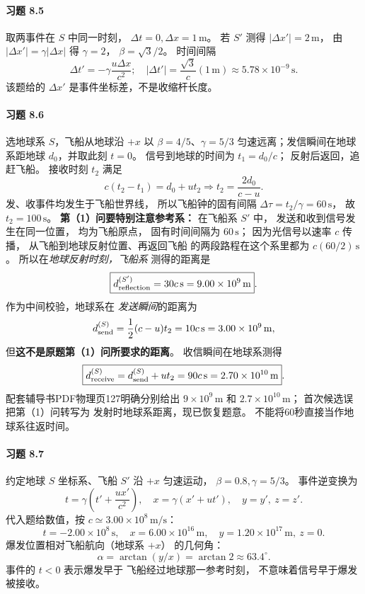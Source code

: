 \paragraph{习题 8.5}
取两事件在 \(S\) 中同一时刻，
\(\Delta t=0,\Delta x=1\,\mathrm m\)。
若 \(S'\) 测得
\(|\Delta x'|=2\,\mathrm m\)，
由 \(|\Delta x'|=\gamma|\Delta x|\) 得
\(\gamma=2\)，
\(\beta=\sqrt3/2\)。
时间间隔
\[
 \Delta t'=-\gamma\frac{u\Delta x}{c^2};
\quad
 \boxed{|\Delta t'|=\frac{\sqrt3}{c}
 (1\,\mathrm m)\approx5.78\times10^{-9}\,\mathrm s}.
\]
该题给的 \(\Delta x'\)
是事件坐标差，不是收缩杆长度。

\paragraph{习题 8.6}
选地球系 \(S\)，飞船从地球沿 \(+x\)
以 \(\beta=4/5\)、\(\gamma=5/3\)
匀速远离；发信瞬间在地球系距地球
\(d_0\)，并取此刻 \(t=0\)。
信号到地球的时间为
\(t_1=d_0/c\)；
反射后返回，追赶飞船。
接收时刻 \(t_2\) 满足
\[
 c(t_2-t_1)=d_0+ut_2
 \Longrightarrow t_2=\frac{2d_0}{c-u}.
\]
发、收事件均发生于飞船世界线，
所以飞船钟的固有间隔
\(\Delta\tau=t_2/\gamma=60\,\mathrm s\)，
故 \(t_2=100\,\mathrm s\)。
\textbf{第（1）问要特别注意参考系：}
在飞船系 \(S'\) 中，
发送和收到信号发生在同一位置，
均为飞船原点，
固有时间间隔为 \(60\,\mathrm s\)；
因为光信号以速率 \(c\) 传播，
从飞船到地球反射位置、再返回飞船
的两段路程在这个系里都为
\(c(60/2)\,\mathrm s\)。
所以在\emph{地球反射时刻，飞船系}
测得的距离是
\[
 \boxed{d_{\rm reflection}^{(S')}
 =30c\,\mathrm s=9.00\times10^9\,\mathrm m}.
\]
作为中间校验，地球系在
\emph{发送瞬间}的距离为
\[
 d_{\rm send}^{(S)}=\frac12(c-u)t_2
 =10c\,\mathrm s=3.00\times10^9\,\mathrm m,
\]
但\textbf{这不是原题第（1）问所要求的距离}。
收信瞬间在地球系测得
\[
 \boxed{d_{\rm receive}^{(S)}
 =d_{\rm send}^{(S)}+ut_2
 =90c\,\mathrm s
 =2.70\times10^{10}\,\mathrm m}.
\]
配套辅导书PDF物理页127明确分别给出
\(9\times10^9\,\mathrm m\) 和
\(2.7\times10^{10}\,\mathrm m\)；
首次候选误把第（1）问转写为
发射时地球系距离，现已恢复题意。
不能将60秒直接当作地球系往返时间。

\paragraph{习题 8.7}
约定地球 \(S\) 坐标系、飞船 \(S'\)
沿 \(+x\) 匀速运动，
\(\beta=0.8,\gamma=5/3\)。
事件逆变换为
\[
 \boxed{t=\gamma\left(t'+\frac{ux'}{c^2}\right)},
 \quad
 \boxed{x=\gamma(x'+ut')},\quad
 y=y',\ z=z'.
\]
代入题给数值，按 \(c\simeq3.00\times10^8\,\mathrm{m/s}\)：
\[
 \boxed{t=-2.00\times10^8\,\mathrm s},\quad
 \boxed{x=6.00\times10^{16}\,\mathrm m},\quad
 \boxed{y=1.20\times10^{17}\,\mathrm m,\ z=0}.
\]
爆发位置相对飞船航向（地球系 \(+x\)）
的几何角：
\[
 \boxed{\alpha=\arctan(y/x)
 =\arctan 2\approx63.4^\circ}.
\]
事件的 \(t<0\) 表示爆发早于
飞船经过地球那一参考时刻，
不意味着信号早于爆发被接收。

